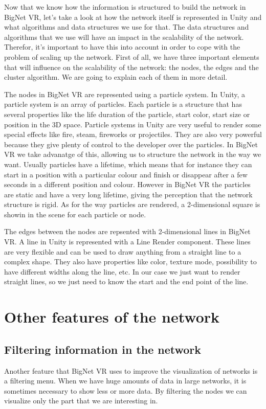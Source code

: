 Now that we know how the information is structured to build the network in BigNet VR, let's take a look at how the network itself is represented in Unity and what algorithms and data structures we use for that. The data structures and algorithms that we use will have an impact in the scalability of the network. Therefor, it's important to have this into account in order to cope with the problem of scaling up the network. First of all, we have three important elements that will influence on the scalability of the network: the nodes, the edges and the cluster algorithm. We are going to explain each of them in more detail.

The nodes in BigNet VR are represented using a particle system. In Unity, a particle system\cite{particle_system} is an array of particles. Each particle is a structure that has several properties like the life duration of the particle, start color, start size or position in the 3D space. Particle systems in Unity are very useful to render some special effects like fire, steam, fireworks or projectiles. They are also very powerful because they give plenty of control to the developer over the particles. In BigNet VR we take advanatge of this, allowing us to structure the network in the way we want. Usually particles have a lifetime, which means that for instance they can start in a position with a particular colour and finish or disappear after a few seconds in a different position and colour. However in BigNet VR the particles are static and have a very long lifetime, giving the perception that the network structure is rigid. As for the way particles are rendered, a 2-dimensional square is showin in the scene for each particle or node.

The edges between the nodes are repsented with 2-dimensional lines in BigNet VR. A line in Unity is represented with a Line Render component\cite{line_render}. These lines are very flexible and can be used to draw anything from a straight line to a complex shape. They also have properties like color, texture mode, possibility to have different widths along the line, etc. In our case we just want to render straight lines, so we just need to know the start and the end point of the line.

\section{Other features of the network}

\subsection{Filtering information in the network}
Another feature that BigNet VR uses to improve the visualization of networks is a filtering menu. When we have huge amounts of data in large networks, it is sometimes necessary to show less or more data. By filtering the nodes we can visualize only the part that we are interesting in.


